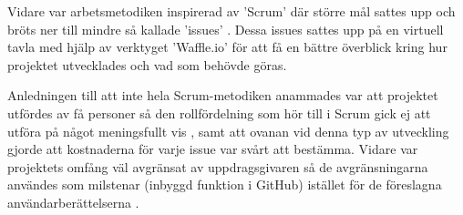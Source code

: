         Vidare var arbetsmetodiken inspirerad av 'Scrum' där större mål sattes upp och bröts ner till mindre så kallade 'issues' \cite[kap.~8]{scrum}. Dessa issues sattes upp på en virtuell tavla med hjälp av verktyget 'Waffle.io' för att få en bättre överblick kring hur projektet utvecklades och vad som behövde göras. \bigskip

        Anledningen till att inte hela Scrum-metodiken anammades var att projektet utfördes av få personer så den rollfördelning som hör till i Scrum gick ej att utföra på något meningsfullt vis \cite[kap.~6]{scrum}, samt att ovanan vid denna typ av utveckling gjorde att kostnaderna för varje issue var svårt att bestämma. Vidare var projektets omfång väl avgränsat av uppdrags\-givaren så de avgränsningarna användes som milstenar (inbyggd funktion i GitHub) istället för de föreslagna användarberättelserna \cite[kap.~9]{scrum}. 

